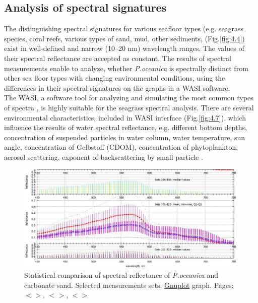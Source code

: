 \documentclass[11pt]{article}
\begin{document}
\subsection{Analysis of spectral signatures}
The distinguishing spectral signatures for various seafloor types (e.g. seagrass species, coral reefs,
various types of sand, mud, other sediments, (Fig.\ref{fig:4.4})\label{page-31} exist in well-defined and narrow (10–20 nm)
wavelength ranges. 
The values of their spectral reflectance are accepted as constant. The results of
spectral measurements enable to analyze, whether \textit{P.oceanica} is spectrally distinct from other sea
floor types with changing environmental conditions, using the differences in their spectral signatures
on the graphs in a \ac{WASI} software. \\The \ac{WASI}, a
software tool for analyzing and simulating the most common types of spectra \cite{Gege05}\label{Gege05}, is highly
suitable for the seagrass spectral analysis.
There are several environmental characteristics, included in \ac{WASI} interface (Fig.\ref{fig:4.7}), which influence the
results of water spectral reflectance, e.g. different bottom depths, concentration of suspended particles
in water column, water temperature, sun angle, concentration of Gelbstoff (\ac{CDOM}), concentration of phytoplankton, aerosol scattering, exponent of backscattering by small
particle \cite{Gege04}\label{Gege04}. 

\begin{figure}[H]
	\centering
	\includegraphics[scale=0.35]{GNU-20-new.jpg}
	\caption{Statistical comparison of spectral reflectance of \textit{P.oceanica} and carbonate sand. Selected measurements sets. \href{http://www.gnuplot.info/}{Gnuplot} graph. Pages: $<$\pageref{page-28}$>$, $<$\pageref{page-47}$>$, $<$\pageref{dataprep}$>$}
	\label{fig:28}
\end{figure}
\end{document}
